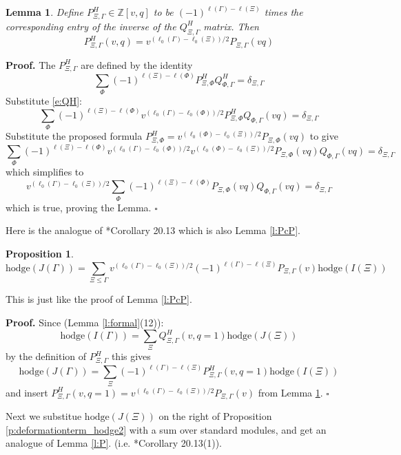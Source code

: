 \documentclass[12pt,leqno]{article}
\newtheorem{lemma}[equation]{Lemma}
\newtheorem{proposition}[equation]{Proposition}
\newcommand{\qed}{\hfill $\square$ \medskip}
\newenvironment{proof}[1][Proof]{\noindent\textbf{#1.} }{\qed}
\newcommand{\hodge}{\text{hodge}}
\newcommand{\Z}{\mathbb Z}
\begin{document}
\begin{lemma}
\label{l:PHP}
Define $P^H_{\Xi,\Gamma}\in\Z[v,q]$ to be
$(-1)^{\ell(\Gamma)-\ell(\Xi)}$ times the corresponding entry of the
inverse of the $Q^H_{\Xi,\Gamma}$ matrix.
Then
$$
P^H_{\Xi,\Gamma}(v,q)=v^{(\ell_0(\Gamma)-\ell_0(\Xi))/2}P_{\Xi,\Gamma}(vq)
$$
\end{lemma}

\begin{proof}
The $P^H_{\Xi,\Gamma}$ are defined by the identity
$$
\sum_{\Phi}(-1)^{\ell(\Xi)-\ell(\Phi)}P^H_{\Xi,\Phi}Q^H_{\Phi,\Gamma}=\delta_{\Xi,\Gamma}
$$
Substitute \eqref{e:QH}:
$$
\sum_{\Phi}(-1)^{\ell(\Xi)-\ell(\Phi)}v^{(\ell_0(\Gamma)-\ell_0(\Phi))/2}P^H_{\Xi,\Phi}Q_{\Phi,\Gamma}(vq)=\delta_{\Xi,\Gamma}
$$
Substitute the proposed formula $P^H_{\Xi,\Phi}=v^{(\ell_0(\Phi)-\ell_0(\Xi))/2}P_{\Xi,\Phi}(vq)$
to give
$$
\sum_{\Phi}(-1)^{\ell(\Xi)-\ell(\Phi)}v^{(\ell_0(\Gamma)-\ell_0(\Phi))/2}
v^{(\ell_0(\Phi)-\ell_0(\Xi))/2}
P_{\Xi,\Phi}(vq)Q_{\Phi,\Gamma}(vq)=\delta_{\Xi,\Gamma}
$$
which simplifies to
$$
v^{(\ell_0(\Gamma)-\ell_0(\Xi))/2}
\sum_{\Phi}(-1)^{\ell(\Xi)-\ell(\Phi)}
P_{\Xi,\Phi}(vq)Q_{\Phi,\Gamma}(vq)=\delta_{\Xi,\Gamma}
$$
which is true, proving the Lemma.
\end{proof}

Here is the analogue of \cite{unitaryDual}*{Corollary 20.13} which is also Lemma \ref{l:PcP}.

\begin{proposition}
\label{p:P}
\normalfont
$$
\hodge(J(\Gamma))=\sum_{\Xi\le\Gamma}v^{(\ell_0(\Gamma)-\ell_0(\Xi))/2}
(-1)^{\ell(\Gamma)-\ell(\Xi)}
P_{\Xi,\Gamma}(v)\hodge(I(\Xi))
$$
\end{proposition}


This is just like the proof of Lemma \ref{l:PcP}.

\begin{proof}
Since (Lemma \ref{l:formal}(12)):
$$
\hodge(I(\Gamma))=\sum_\Xi Q^H_{\Xi,\Gamma}(v,q=1)\hodge(J(\Xi))
$$
by the definition of $P^H_{\Xi,\Gamma}$ this gives
$$
\hodge(J(\Gamma))=\sum_\Xi (-1)^{\ell(\Gamma)-\ell(\Xi)}P^H_{\Xi,\Gamma}(v,q=1)\hodge(I(\Xi))
$$
and insert $P^H_{\Xi,\Gamma}(v,q=1)=v^{(\ell_0(\Gamma)-\ell_0(\Xi))/2}P_{\Xi,\Gamma}(v)$ from Lemma \ref{l:PHP}.
\end{proof}


Next we substitue $\hodge(J(\Xi))$ on the right of Proposition \ref{p:deformationterm_hodge2} with a sum over standard modules, and get  an analogue of  Lemma \ref{l:P}.
(i.e. \cite{unitaryDual}*{Corollary 20.13(1)}).
\end{document}

